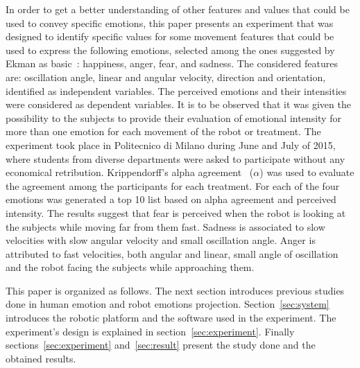 In order to get a better understanding of other features and values that could be used to convey specific emotions, this paper presents an experiment that was designed to identify specific values for some movement features that could be used to express the following emotions, selected among the ones suggested by Ekman as basic~\cite{Ekman2004}: happiness, anger, fear, and sadness. The considered features are: oscillation angle, linear and angular velocity, direction and orientation, identified as independent variables. The perceived emotions and their intensities were considered as dependent variables. It is to be observed that it was given the possibility to the subjects to provide their evaluation of emotional intensity for more than one emotion for each movement of the robot or treatment. The experiment took place in Politecnico di Milano during June and July of 2015, where students from diverse departments were asked to participate without any economical retribution. Krippendorff's alpha agreement~\cite{Krippendorff2007} ($\alpha$) was used to evaluate the agreement among the participants for each treatment. For each of the four emotions was generated a top 10 list based on alpha agreement and perceived intensity. The results suggest that fear is perceived when the robot is looking at the subjects while moving far from them fast. Sadness is associated to slow velocities with slow angular velocity and small oscillation angle. Anger is attributed to fast velocities, both angular and linear, small angle of oscillation and the robot facing the subjects while approaching them.

This paper is organized as follows. The next section introduces previous studies done in human emotion and robot emotions projection. Section~\ref{sec:system} introduces the robotic platform and the software used in the experiment. The experiment's design is explained in section~\ref{sec:experiment}. Finally sections~\ref{sec:experiment} and~\ref{sec:result} present the study done and the obtained results.